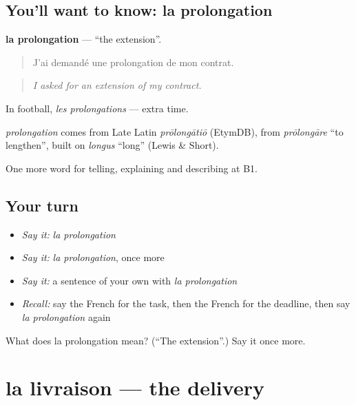 \subsection*{You'll want to know: la prolongation}
\textbf{la prolongation} — \textquotedblleft{}the extension\textquotedblright{}.

\begin{quote}
J'ai demandé une prolongation de mon contrat.
\end{quote}

\begin{quote}
\emph{I asked for an extension of my contract.}
\end{quote}

In football, \emph{les prolongations} — extra time.

\begin{cousinweb}
\emph{prolongation} comes from Late Latin \emph{prōlongātiō} (EtymDB), from \emph{prōlongāre} \textquotedblleft{}to lengthen\textquotedblright{}, built on \emph{longus} \textquotedblleft{}long\textquotedblright{} (Lewis \& Short).
\end{cousinweb}

\begin{grammarlens}[title={What you've built}]
One more word for telling, explaining and describing at B1.
\end{grammarlens}

\subsection*{Your turn}
\begin{itemize}
\raggedright
  \item \emph{Say it:} \emph{la prolongation}
  \item \emph{Say it:} \emph{la prolongation}, once more
  \item \emph{Say it:} a sentence of your own with \emph{la prolongation}
  \item \emph{Recall:} say the French for the task, then the French for the deadline, then say \emph{la prolongation} again
\end{itemize}

\begin{tcolorbox}[breakable,colback=teal!4,colframe=teal!35!black,title={Before you move on}]
What does la prolongation mean? (\textquotedblleft{}The extension\textquotedblright{}.) Say it once more.
\end{tcolorbox}
\section[la livraison]{la livraison — the delivery}

